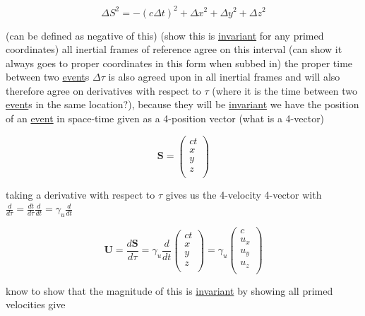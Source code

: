 \begin{equation}
	\Delta S^2 = -(c\Delta t)^2 +\Delta x^2 +\Delta y^2 +\Delta z^2
\end{equation}

(can be defined as negative of this) (show this is \hyperlink{def-lorentz-invariant}{invariant} for any primed coordinates)
all inertial frames of reference agree on this interval (can show it always goes to proper coordinates in this form when subbed in)
the proper time between two \hyperlink{def-event}{event}s $\Delta\tau$ is also agreed upon in all inertial frames
and will also therefore agree on derivatives with respect to $\tau$ (where it is the time between two \hyperlink{def-event}{event}s in the same location?), because they will be \hyperlink{def-lorentz-invariant}{invariant}
we have the position of an \hyperlink{def-event}{event} in space-time given as a 4-position vector (what is a 4-vector)

\begin{equation}
	\mathbf{S} =
	\begin{pmatrix}
		ct \\
		x  \\
		y  \\
		z  \\
	\end{pmatrix}
\end{equation}

taking a derivative with respect to $\tau$ gives us the 4-velocity 4-vector with $\frac{d}{d\tau} = \frac{dt}{d\tau}\frac{d}{dt} = \gamma_u \frac{d}{dt} $

\begin{equation}
	\mathbf{U} = \frac{d\mathbf{S}}{d\tau} = \gamma_u \frac{d}{dt}
	\begin{pmatrix}
		ct \\
		x  \\
		y  \\
		z  \\
	\end{pmatrix}
	= \gamma_u
	\begin{pmatrix}
		c   \\
		u_x \\
		u_y \\
		u_z \\
	\end{pmatrix}
\end{equation}

know to show that the magnitude of this is \hyperlink{def-lorentz-invariant}{invariant} by showing all primed velocities give

